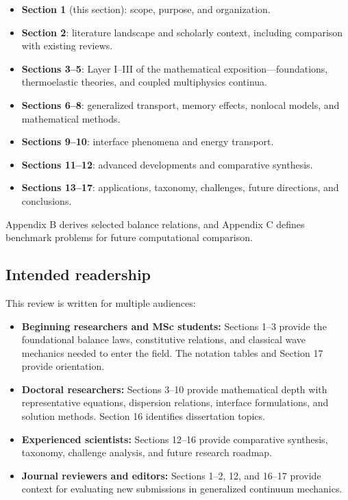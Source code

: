 \begin{itemize}
\item \textbf{Section 1} (this section): scope, purpose, and organization.
\item \textbf{Section 2}: literature landscape and scholarly context, including comparison with existing reviews.
\item \textbf{Sections 3--5}: Layer I--III of the mathematical exposition—foundations, thermoelastic theories, and coupled multiphysics continua.
\item \textbf{Sections 6--8}: generalized transport, memory effects, nonlocal models, and mathematical methods.
\item \textbf{Sections 9--10}: interface phenomena and energy transport.
\item \textbf{Sections 11--12}: advanced developments and comparative synthesis.
\item \textbf{Sections 13--17}: applications, taxonomy, challenges, future directions, and conclusions.
\end{itemize}

Appendix B derives selected balance relations, and Appendix C defines benchmark problems for future computational comparison.

\subsection{Intended readership}

This review is written for multiple audiences:

\begin{itemize}
\item \textbf{Beginning researchers and MSc students:} Sections 1--3 provide the foundational balance laws, constitutive relations, and classical wave mechanics needed to enter the field. The notation tables and Section 17 provide orientation.
\item \textbf{Doctoral researchers:} Sections 3--10 provide mathematical depth with representative equations, dispersion relations, interface formulations, and solution methods. Section 16 identifies dissertation topics.
\item \textbf{Experienced scientists:} Sections 12--16 provide comparative synthesis, taxonomy, challenge analysis, and future research roadmap.
\item \textbf{Journal reviewers and editors:} Sections 1--2, 12, and 16--17 provide context for evaluating new submissions in generalized continuum mechanics.
\end{itemize}

